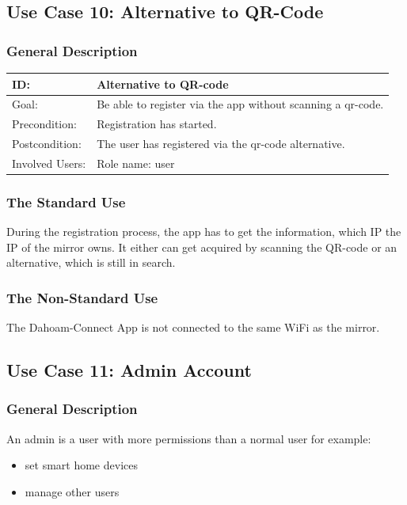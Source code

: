 \documentclass[12pt]{article}
\theoremstyle{definition}
\begin{document}
\subsection{Use Case 10: Alternative to QR-Code}
\subsubsection{General Description}
\begin{tabular}{|p{.2\linewidth}|p{.65\linewidth}|}
\hline 
ID: & Alternative to QR-code\\ \hline
Goal: & Be able to register via the app without scanning a qr-code. \\ \hline
Precondition: & Registration has started.\\ \hline
Postcondition: &  The user has registered via the qr-code alternative.\\ \hline
Involved Users: & Role name: user \\ \hline
\end{tabular}

\subsubsection{The Standard Use}
During the registration process, the app has to get the information, which IP the IP of the mirror owns. It either can get acquired by scanning the QR-code or an alternative, which is still in search.

\subsubsection{The Non-Standard Use}
The Dahoam-Connect App is not connected to the same WiFi as the mirror.

\subsection{Use Case 11: Admin Account}
\subsubsection{General Description}

An admin is a user with more permissions than a normal user for example:
\begin{itemize}
    \item set smart home devices
    \item manage other users
\end{itemize}\\
\end{document}

